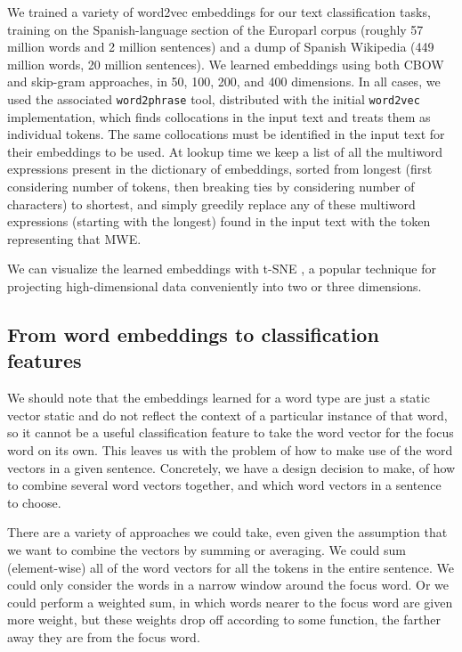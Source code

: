 We trained a variety of word2vec embeddings for our text classification tasks,
training on the Spanish-language section of the Europarl corpus (roughly 57
million words and 2 million sentences) and a dump of Spanish Wikipedia (449
million words, 20 million sentences). We learned embeddings using both CBOW and
skip-gram approaches, in 50, 100, 200, and 400 dimensions. In all cases, we
used the associated \texttt{word2phrase} tool, distributed with the initial
\texttt{word2vec} implementation, which finds collocations in the input text
and treats them as individual tokens. The same collocations must be identified
in the input text for their embeddings to be used. At lookup time we keep a
list of all the multiword expressions present in the dictionary of embeddings,
sorted from longest (first considering number of tokens, then breaking ties by
considering number of characters) to shortest, and simply greedily replace any
of these multiword expressions (starting with the longest) found in the input
text with the token representing that MWE.

We can visualize the learned embeddings with t-SNE \cite{van2008visualizing},
a popular technique for projecting high-dimensional data conveniently into two
or three dimensions.

\subsection{From word embeddings to classification features}
We should note that the embeddings learned for a word type are just a static
vector static and do not reflect the context of a particular instance of that
word, so it cannot be a useful classification feature to take the word vector
for the focus word on its own. This leaves us with the problem of how to make
use of the word vectors in a given sentence. Concretely, we have a design
decision to make, of how to combine several word vectors together, and which
word vectors in a sentence to choose.

There are a variety of approaches we could take, even given the assumption that
we want to combine the vectors by summing or averaging. We could sum
(element-wise) all of the word vectors for all the tokens in the entire
sentence. We could only consider the words in a narrow window around the focus
word. Or we could perform a weighted sum, in which words nearer to the focus
word are given more weight, but these weights drop off according to some
function, the farther away they are from the focus word.


